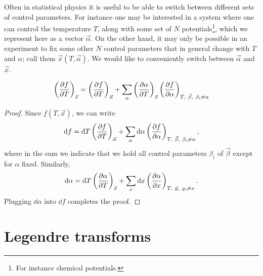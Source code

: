 Often in statistical physics it is useful to be able to switch between different
sets of control parameters. For instance one may be interested in a system where
one can control the temperature $T$, along with some set of $N$
potentials\footnote{For instance chemical potentials.},
which we represent here as a vector $\vec\alpha$. On the other hand, it may only
be possible in an experiment to fix some other $N$ control parameters that in
general change with $T$ and $\alpha$; call them $\vec{x}(T,\vec\alpha)$. We
would like to conveniently switch between $\vec\alpha$ and $\vec{x}$.

\begin{proposition}{}{}
\begin{equation*}
\left( \pdv{f}{T} \right)_{\vec{x}} =  \left(\pdv{f}{T}\right)_{\vec\alpha}
+\sum_\alpha 
\left(\pdv{\alpha}{T}\right)_{\vec{x}}
\left(\pdv{f}{\alpha}\right)_{T,~\vec{\beta},~\beta_i\neq\alpha} 
\end{equation*}
\begin{proof}
Since $f(T,\vec{x})$, we can write
\begin{equation*}
\dd f=\dd T \left( \pdv{f}{T} \right)_{\vec{\alpha}} 
+ \sum_\alpha\dd\alpha\left(\pdv{f}{\alpha}\right)_{T,~\vec{\beta},~\beta_i\neq\alpha},
\end{equation*}
where in the sum we indicate that we hold all control parameters $\beta_i$ of
$\vec{\beta}$ except for $\alpha$ fixed. Similarly,
\begin{equation*}
\dd\alpha=\dd T \left( \pdv{\alpha}{T} \right)_{\vec{x}} 
+ \sum_x\dd x\left(\pdv{\alpha}{x}\right)_{T,~\vec{y},~y_i\neq x}.
\end{equation*}
Plugging $\dd \alpha$ into $\dd f$ completes the proof.
\end{proof}
\end{proposition}




\section{Legendre transforms}

